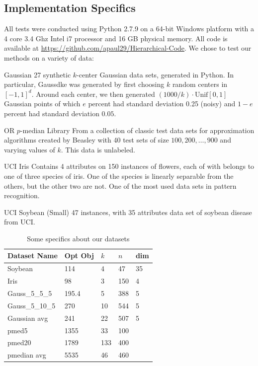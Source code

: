 \documentclass[conference, 10pt, final]{IEEEtran}
\begin{document}
\subsection{Implementation Specifics}

All tests were conducted using Python 2.7.9 on a 64-bit Windows platform with a 4 core 3.4 Ghz Intel i7 processor and 16 GB physical memory. All code is available at \url{https://github.com/apaul29/Hierarchical-Code}.
We chose to test our methods on a variety of data:
\begin{LaTeXdescription}
\item[Gaussian] 27 synthetic $k$-center Gaussian data sets, generated in Python. In particular, Gauss\textunderscore d\textunderscore k\textunderscore e was generated by first choosing $k$ random centers in $[-1,1]^d$. Around each center, we then generated $(1000/k) \cdot \mathrm{Unif}[0,1]$ Gaussian points of which $e$ percent had standard deviation 0.25 (noisy) and $1-e$ percent had standard deviation $0.05$. 
\item[OR $p$-median Library] \cite{Beasley} From a collection of classic test data sets for approximation algorithms created by Beasley with 40 test sets of size $100, 200, \ldots, 900$ and varying values of $k$. This data is unlabeled.
\item[UCI Iris] \cite{Iris} Contains 4 attributes on 150 instances of flowers, each of with belongs to one of three species of iris.  One of the species is linearly separable from the others, but the other two are not.  One of the most used data sets in pattern recognition.
\item[UCI Soybean (Small)] \cite{Soybean} 47 instances, with 35 attributes data set of soybean disease from UCI.
\end{LaTeXdescription} 

\begin{table}[!t]
\caption{Some specifics about our datasets}
\label{table_specifics}
\centering
\begin{tabular}{ | l | l | l | l | l | }
\hline
 Dataset Name & Opt Obj & $k$ & $n$ & dim \\ \hline
Soybean & 114 & 4 & 47 & 35 \\ 
Iris & 98 & 3 & 150 & 4 \\ 
Gauss\_5\_5\_5 & 195.4 & 5 & 388 & 5 \\ 
Gauss\_5\_10\_5 & 270 & 10 & 544 & 5 \\ 
Gaussian avg & 241 & 22 & 507 & 5 \\ 
pmed5 & 1355 & 33 & 100 & \  \\ 
pmed20 & 1789 & 133 & 400 & \  \\ 
pmedian avg & 5535 & 46 & 460 & \  \\ \hline
 \end{tabular}
\end{table}
\end{document}
